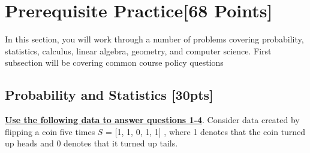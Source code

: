 \documentclass[12pt]{article}
\begin{document}
\section{Prerequisite Practice[68 Points]}

In this section, you will work through a number of problems covering probability, statistics, calculus, linear algebra, geometry, and computer science. First subsection will be covering common course policy questions

\subsection{Probability and Statistics [30pts]}

\textbf{\underline{Use the following data to answer questions 1-4}}. Consider data created by flipping a coin five times $S $ = [1, 1, 0, 1, 1] , where 1 denotes that the coin turned up heads and 0 denotes that it turned up tails. \bigskip
\end{document}
